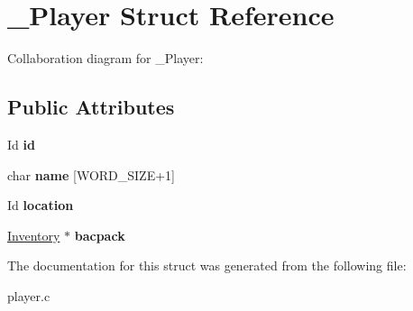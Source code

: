 \hypertarget{struct__Player}{}\section{\+\_\+\+Player Struct Reference}
\label{struct__Player}


Collaboration diagram for \+\_\+\+Player\+:
\subsection*{Public Attributes}
\begin{DoxyCompactItemize}
\item 
\mbox{\label{struct__Player_a60d635cd063816a9c1bd873f4868bb90}} 
Id {\bfseries id}
\item 
\mbox{\label{struct__Player_ac89715f913cc607b75eb7236765c41f5}} 
char {\bfseries name} \mbox{[}W\+O\+R\+D\+\_\+\+S\+I\+ZE+1\mbox{]}
\item 
\mbox{\label{struct__Player_adbb6195d15b88f3f658e74274eff52d8}} 
Id {\bfseries location}
\item 
\mbox{\label{struct__Player_a4382cde1a694ca78bdcf58a2b1f1b982}} 
\hyperlink{struct__Inventory}{Inventory} $\ast$ {\bfseries bacpack}
\end{DoxyCompactItemize}


The documentation for this struct was generated from the following file\+:\begin{DoxyCompactItemize}
\item 
player.\+c\end{DoxyCompactItemize}
